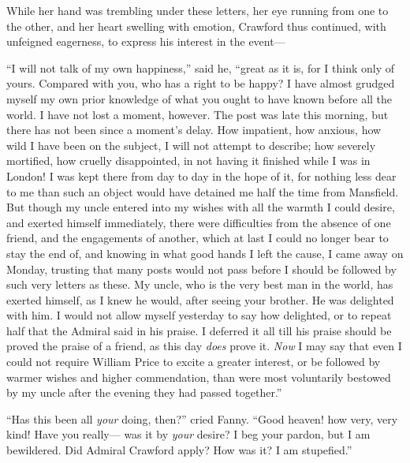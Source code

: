 \documentclass{article}
\begin{document}
While her hand was trembling under these letters,
her eye running from one to the other, and her heart
swelling with emotion, Crawford thus continued,
with unfeigned eagerness, to express his interest in the event---%

``I will not talk of my own happiness,'' said he, ``great as
it is, for I think only of yours.  Compared with you,
who has a right to be happy?  I have almost grudged myself
my own prior knowledge of what you ought to have known
before all the world.  I have not lost a moment, however.
The post was late this morning, but there has not been
since a moment's delay.  How impatient, how anxious,
how wild I have been on the subject, I will not attempt
to describe; how severely mortified, how cruelly disappointed,
in not having it finished while I was in London!
I was kept there from day to day in the hope of it,
for nothing less dear to me than such an object would
have detained me half the time from Mansfield.
But though my uncle entered into my wishes with all the
warmth I could desire, and exerted himself immediately,
there were difficulties from the absence of one friend,
and the engagements of another, which at last I could no longer
bear to stay the end of, and knowing in what good hands I
left the cause, I came away on Monday, trusting that many
posts would not pass before I should be followed by such
very letters as these.  My uncle, who is the very best man
in the world, has exerted himself, as I knew he would,
after seeing your brother.  He was delighted with him.
I would not allow myself yesterday to say how delighted,
or to repeat half that the Admiral said in his praise.
I deferred it all till his praise should be proved
the praise of a friend, as this day \emph{does} prove it.
\emph{Now} I may say that even I could not require William
Price to excite a greater interest, or be followed
by warmer wishes and higher commendation, than were most
voluntarily bestowed by my uncle after the evening they had
passed together.''

``Has this been all \emph{your} doing, then?'' cried Fanny.
``Good heaven! how very, very kind!  Have you really---%
was it by \emph{your} desire?  I beg your pardon, but I
am bewildered.  Did Admiral Crawford apply?  How was it?
I am stupefied.''
\end{document}
